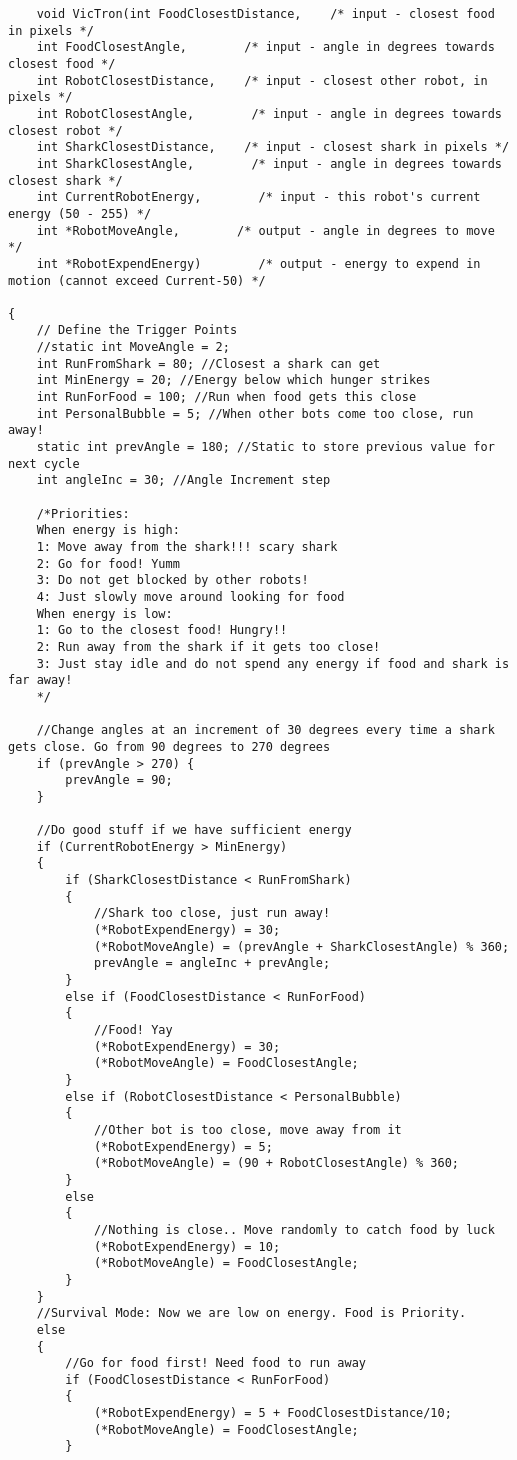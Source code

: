 \documentclass[12pt]{article}
\begin{document}
%
\begin{verbatim}
	void VicTron(int FoodClosestDistance,    /* input - closest food in pixels */
    int FoodClosestAngle,        /* input - angle in degrees towards closest food */
    int RobotClosestDistance,    /* input - closest other robot, in pixels */
    int RobotClosestAngle,        /* input - angle in degrees towards closest robot */
    int SharkClosestDistance,    /* input - closest shark in pixels */
    int SharkClosestAngle,        /* input - angle in degrees towards closest shark */
    int CurrentRobotEnergy,        /* input - this robot's current energy (50 - 255) */
    int *RobotMoveAngle,        /* output - angle in degrees to move */
    int *RobotExpendEnergy)        /* output - energy to expend in motion (cannot exceed Current-50) */

{
    // Define the Trigger Points
    //static int MoveAngle = 2;
    int RunFromShark = 80; //Closest a shark can get
    int MinEnergy = 20; //Energy below which hunger strikes
    int RunForFood = 100; //Run when food gets this close
    int PersonalBubble = 5; //When other bots come too close, run away!
    static int prevAngle = 180; //Static to store previous value for next cycle
    int angleInc = 30; //Angle Increment step

    /*Priorities:
    When energy is high:
    1: Move away from the shark!!! scary shark
    2: Go for food! Yumm
    3: Do not get blocked by other robots!
    4: Just slowly move around looking for food
    When energy is low:
    1: Go to the closest food! Hungry!!
    2: Run away from the shark if it gets too close!
    3: Just stay idle and do not spend any energy if food and shark is far away!
    */

    //Change angles at an increment of 30 degrees every time a shark gets close. Go from 90 degrees to 270 degrees
    if (prevAngle > 270) {
        prevAngle = 90;
    }

    //Do good stuff if we have sufficient energy
    if (CurrentRobotEnergy > MinEnergy)
    {
        if (SharkClosestDistance < RunFromShark)
        {
            //Shark too close, just run away!
            (*RobotExpendEnergy) = 30;
            (*RobotMoveAngle) = (prevAngle + SharkClosestAngle) % 360;
            prevAngle = angleInc + prevAngle;
        }
        else if (FoodClosestDistance < RunForFood)
        {
            //Food! Yay
            (*RobotExpendEnergy) = 30;
            (*RobotMoveAngle) = FoodClosestAngle;
        }
        else if (RobotClosestDistance < PersonalBubble)
        {
            //Other bot is too close, move away from it
            (*RobotExpendEnergy) = 5;
            (*RobotMoveAngle) = (90 + RobotClosestAngle) % 360;
        }
        else
        {
            //Nothing is close.. Move randomly to catch food by luck
            (*RobotExpendEnergy) = 10;
            (*RobotMoveAngle) = FoodClosestAngle;
        }
    }
    //Survival Mode: Now we are low on energy. Food is Priority.
    else
    {
        //Go for food first! Need food to run away
        if (FoodClosestDistance < RunForFood)
        {
            (*RobotExpendEnergy) = 5 + FoodClosestDistance/10;
            (*RobotMoveAngle) = FoodClosestAngle;
        }


\end{verbatim}
\end{document}
